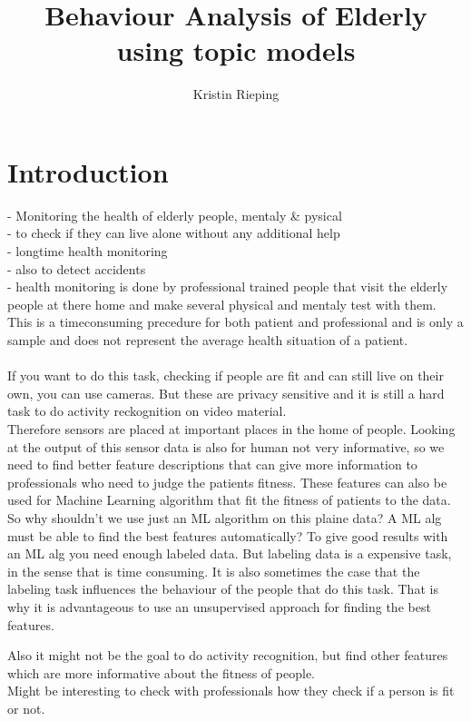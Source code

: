 \documentclass[11pt,a4paper]{article}
\title{Behaviour Analysis of Elderly using topic models}
\author{Kristin Rieping}
\begin{document}
\section{Introduction}

- Monitoring the health of elderly people, mentaly & pysical\\
- to check if they can live alone without any additional help\\
- longtime health monitoring\\
- also to detect accidents\\
- health monitoring is done by professional trained people that visit the elderly people at there home and make several physical and mentaly test with them. This is a timeconsuming precedure for both patient and professional and is only a sample and does not represent the average health situation of a patient.\\
\\
If you want to do this task, checking if people are fit and can still live on their own, you can use cameras. But these are privacy sensitive and it is still a hard task to do activity reckognition on video material.\\

Therefore sensors are placed at important places in the home of people. Looking at the output of this sensor data is also for human not very informative, so we need to find better feature descriptions that can give more information to professionals who need to judge the patients fitness. These features can also be used for Machine Learning algorithm that fit the fitness of patients to the data.
So why shouldn't we use just an ML algorithm on this plaine data? A ML alg must be able to find the best features automatically?
To give good results with an ML alg you need enough labeled data. But labeling data is a expensive task, in the sense that is time consuming. It is also sometimes the case that the labeling task influences the behaviour of the people that do this task. That is why it is advantageous to use an unsupervised approach for finding the best features.

Also it might not be the goal to do activity recognition, but find other features which are more informative about the fitness of people.\\

Might be interesting to check with professionals how they check if a person is fit or not.
\end{document}
